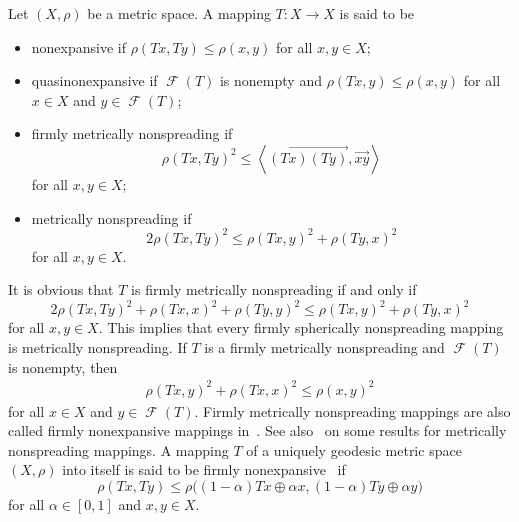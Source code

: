 \documentclass[draft]{amsart}
\numberwithin{equation}{section}
\newcommand{\ip}[2]{\left\langle #1, #2 \right\rangle}
\DeclareMathOperator{\Fix}{\mathcal{F}}
\theoremstyle{plain}
\theoremstyle{definition}
\theoremstyle{remark}
\begin{document}
Let $(X, \rho)$ be a metric space. 
A mapping $T\colon X\to X$ is said to be 
\begin{itemize}
 \item nonexpansive if $\rho(Tx, Ty) \leq \rho(x,y)$ for all $x,y\in X$; 
 \item quasinonexpansive if $\Fix (T)$ is nonempty and 
 $\rho(Tx, y) \leq \rho(x,y)$ for all $x\in X$ and $y\in \Fix (T)$; 
 \item firmly metrically nonspreading if 
 \[
  \rho(Tx,Ty)^2 \leq \ip{\overrightarrow{(Tx)(Ty)}}
 {\overrightarrow{xy}} 
 \]
 for all $x,y\in X$; 
 \item metrically nonspreading if 
 \[
  2\rho(Tx, Ty)^2 \leq \rho(Tx, y)^2 + \rho(Ty, x)^2 
 \]
 for all $x,y\in X$. 
\end{itemize}
It is obvious that $T$ is firmly metrically nonspreading 
if and only if 
\[
  2\rho(Tx, Ty)^2 + \rho(Tx, x)^2 + \rho(Ty, y)^2 
  \leq \rho(Tx, y)^2 + \rho(Ty, x)^2 
\]
for all $x,y\in X$. 
This implies that every firmly spherically 
nonspreading mapping is metrically nonspreading. 
If $T$ is a firmly metrically nonspreading and 
$\Fix(T)$ is nonempty, then 
\begin{align}\label{eq:quasi-fmn}
 \rho(Tx, y)^2 + \rho(Tx, x)^2 \leq \rho(x, y)^2 
\end{align}
for all $x\in X$ and $y\in \Fix(T)$. 
Firmly metrically nonspreading mappings are also called 
firmly nonexpansive mappings in~\cite{MR3679017}. 
See also~\cite{MR4021035} on some results for 
metrically nonspreading mappings. 
A mapping $T$ of a uniquely geodesic metric space 
$(X, \rho)$ into itself is said to be 
firmly nonexpansive~\cite{MR3206460} if 
 \[
  \rho(Tx, Ty) \leq 
  \rho\bigl((1-\alpha) Tx \oplus \alpha x, (1-\alpha) Ty \oplus \alpha y\bigr)
 \]
 for all $\alpha \in [0,1]$ and $x,y\in X$. 
\end{document}
